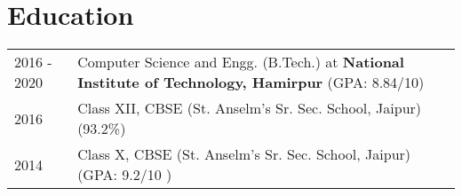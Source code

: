 \documentclass[a4paper,10pt]{article}
\begin{document}
\section{Education}
\begin{tabularx}{\linewidth}{@{}l X@{}}	

2016 - 2020 & Computer Science and Engg. (B.Tech.) at \textbf{National Institute of
Technology, Hamirpur} \hfill (GPA: 8.84/10) \\ 

2016 & Class XII, CBSE (St. Anselm’s Sr. Sec. School, Jaipur) \hfill  (93.2\%) \\

2014 & Class X, CBSE (St. Anselm’s Sr. Sec. School, Jaipur) \hfill  (GPA: 9.2/10  ) \\
\end{tabularx}

\vfill
\end{document}
